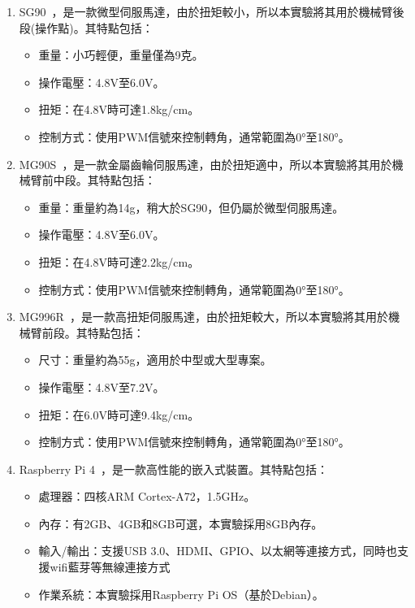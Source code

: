 \documentclass[class=NCU_thesis, crop=false]{standalone}
\begin{document}
\begin{enumerate}
\item SG90~\cite{sg90_servo_motor}，是一款微型伺服馬達，由於扭矩較小，所以本實驗將其用於機械臂後段(操作點)。其特點包括：
\begin{itemize}
    \item 重量：小巧輕便，重量僅為9克。
    \item 操作電壓：4.8V至6.0V。
    \item 扭矩：在4.8V時可達1.8kg/cm。
    \item 控制方式：使用PWM信號來控制轉角，通常範圍為0°至180°。
\end{itemize}

\item MG90S~\cite{mg90s_servo_motor}，是一款金屬齒輪伺服馬達，由於扭矩適中，所以本實驗將其用於機械臂前中段。其特點包括：
\begin{itemize}
    \item 重量：重量約為14g，稍大於SG90，但仍屬於微型伺服馬達。
    \item 操作電壓：4.8V至6.0V。
    \item 扭矩：在4.8V時可達2.2kg/cm。
    \item 控制方式：使用PWM信號來控制轉角，通常範圍為0°至180°。
\end{itemize}

\item MG996R~\cite{mg996r_servo_motor}，是一款高扭矩伺服馬達，由於扭矩較大，所以本實驗將其用於機械臂前段。其特點包括：
\begin{itemize}
    \item 尺寸：重量約為55g，適用於中型或大型專案。
    \item 操作電壓：4.8V至7.2V。
    \item 扭矩：在6.0V時可達9.4kg/cm。
    \item 控制方式：使用PWM信號來控制轉角，通常範圍為0°至180°。
\end{itemize}

\item Raspberry Pi 4~\cite{raspberry_pi_4}，是一款高性能的嵌入式裝置。其特點包括：
\begin{itemize}
    \item 處理器：四核ARM Cortex-A72，1.5GHz。
    \item 內存：有2GB、4GB和8GB可選，本實驗採用8GB內存。
    \item 輸入/輸出：支援USB 3.0、HDMI、GPIO、以太網等連接方式，同時也支援wifi藍芽等無線連接方式
    \item 作業系統：本實驗採用Raspberry Pi OS（基於Debian）。
\end{itemize}


\end{enumerate}
\end{document}
